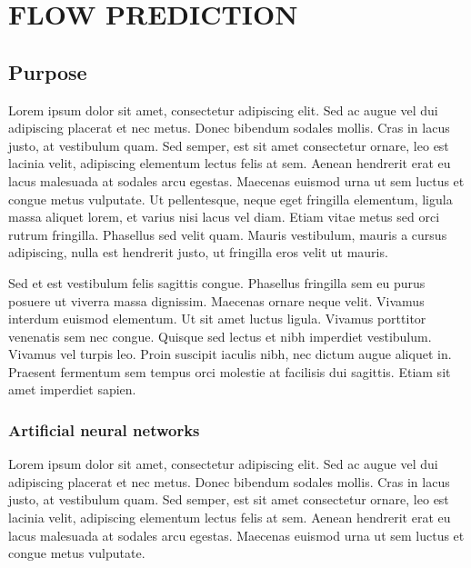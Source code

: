 \chapter{FLOW PREDICTION}\label{ch:fp}

\vspace{-12pt} %

\section{Purpose}

Lorem ipsum dolor sit amet, consectetur adipiscing elit. Sed ac augue vel dui 
adipiscing placerat et nec metus. Donec bibendum sodales mollis. Cras in lacus 
justo, at vestibulum quam. Sed semper, est sit amet consectetur ornare, leo est 
lacinia velit, adipiscing elementum lectus felis at sem. Aenean hendrerit erat eu 
lacus malesuada at sodales arcu egestas. Maecenas euismod urna ut sem luctus et 
congue metus vulputate. Ut pellentesque, neque eget fringilla elementum, ligula 
massa aliquet lorem, et varius nisi lacus vel diam. Etiam vitae metus sed orci 
rutrum fringilla. Phasellus sed velit quam. Mauris vestibulum, mauris a cursus 
adipiscing, nulla est hendrerit justo, ut fringilla eros velit ut mauris.

Sed et est vestibulum felis sagittis congue. Phasellus fringilla sem eu purus 
posuere ut viverra massa dignissim. Maecenas ornare neque velit. Vivamus interdum 
euismod elementum. Ut sit amet luctus ligula. Vivamus porttitor venenatis sem nec 
congue. Quisque sed lectus et nibh imperdiet vestibulum. Vivamus vel turpis leo. 
Proin suscipit iaculis nibh, nec dictum augue aliquet in. Praesent fermentum sem 
tempus orci molestie at facilisis dui sagittis. Etiam sit amet imperdiet sapien. 

\subsection{Artificial neural networks}

Lorem ipsum dolor sit amet, consectetur adipiscing elit. Sed ac augue vel dui 
adipiscing placerat et nec metus. Donec bibendum sodales mollis. Cras in lacus 
justo, at vestibulum quam. Sed semper, est sit amet consectetur ornare, leo est 
lacinia velit, adipiscing elementum lectus felis at sem. Aenean hendrerit erat eu 
lacus malesuada at sodales arcu egestas. Maecenas euismod urna ut sem luctus et 
congue metus vulputate.


